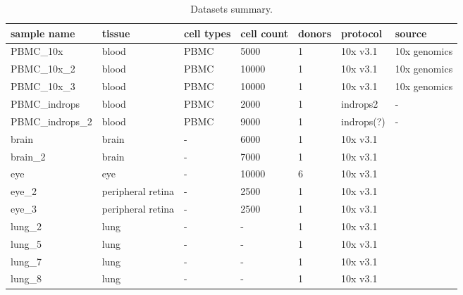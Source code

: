\begin{table}[htbp]
  \centering
  \begin{tabular}{l|llllll}
    \toprule
    sample name & tissue & cell types & cell count & donors & protocol & source \\
    \midrule
    PBMC\_10x & blood & PBMC & 5000 & 1 & 10x v3.1 & 10x genomics \\
    PBMC\_10x\_2 & blood & PBMC & 10000 & 1 & 10x v3.1 & 10x genomics \\
    PBMC\_10x\_3 & blood & PBMC & 10000 & 1 & 10x v3.1 & 10x genomics \\
    PBMC\_indrops & blood & PBMC & 2000 & 1 & indrops2 & - \\
    PBMC\_indrops\_2 & blood & PBMC & 9000 & 1 & indrops(?) & - \\
    brain & brain & - & 6000 & 1 & 10x v3.1 & \cite{Siletti2023} \\
    brain\_2 & brain & - & 7000 & 1 & 10x v3.1 & \cite{Siletti2023} \\
    eye & eye & - & 10000 & 6 & 10x v3.1 & \cite{Menon2019} \\
    eye\_2 & peripheral retina & - & 2500 & 1 & 10x v3.1 & \cite{Voigt2019} \\
    eye\_3 & peripheral retina & - & 2500 & 1 & 10x v3.1 & \cite{Voigt2019} \\
    lung\_2 & lung & - & - & 1 & 10x v3.1 & \cite{Mould2021} \\
    lung\_5 & lung & - & - & 1 & 10x v3.1 & \cite{Mould2021} \\
    lung\_7 & lung & - & - & 1 & 10x v3.1 & \cite{Mould2021} \\
    lung\_8 & lung & - & - & 1 & 10x v3.1 & \cite{Mould2021} \\
    \bottomrule
  \end{tabular}
  \caption{Datasets summary.}
  \label{tab:datasets}
\end{table}
